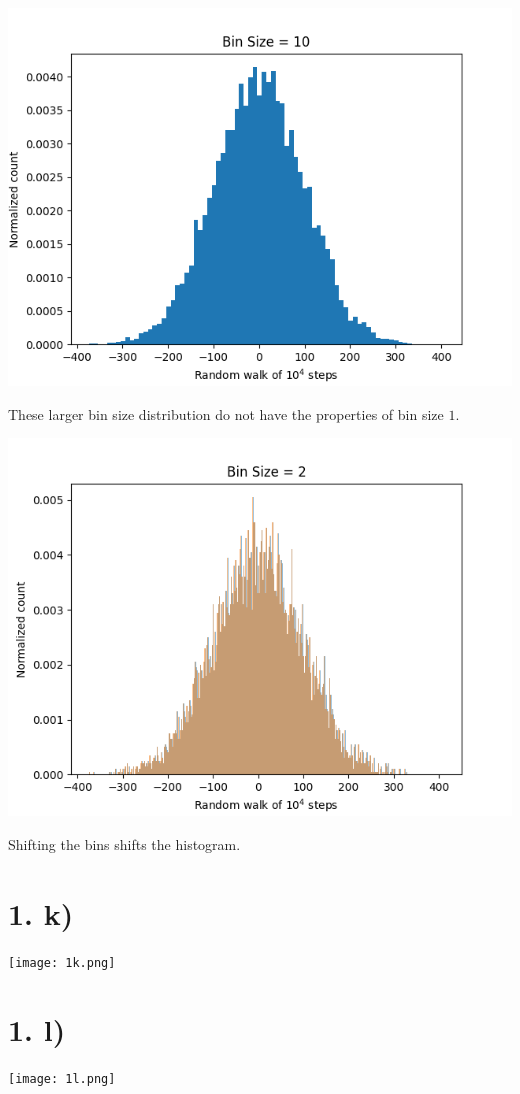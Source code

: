 \documentclass{article}
\begin{document}
\begin{center}
    \includegraphics[scale=0.8]{1ij_dx_10.png}
\end{center}

These larger bin size distribution do not have the properties of bin size $1$.

\begin{center}
    \includegraphics[scale=0.8]{1ij_shifted.png}
\end{center}

Shifting the bins shifts the histogram.

\section*{1. k)}

\begin{center}
    \texttt{[image: 1k.png]}
\end{center}

\section*{1. l)}

\begin{center}
    \texttt{[image: 1l.png]}
\end{center}
\end{document}
